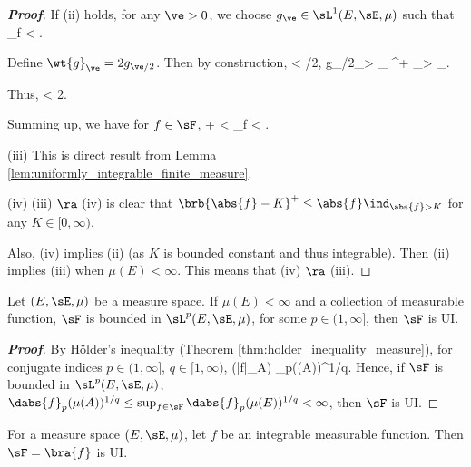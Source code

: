 \begin{proof}[\bf Proof]
If (ii) holds, for any $\ve >0$, we choose $g_\ve \in \sL^1(E,\sE,\mu)$ such that
\be
\sup_{f\in \sF}\mu{} < \ve.
\ee

Define $\wt{g}_\ve = 2g_{\ve/2}$. Then by construction, \be \mu{} \leq \mu{} < \ve/2, \qquad g_{\ve/2}\ind_{>
_\ve} \leq  {}^+ \ind_{> _\ve}. \ee

Thus,
\be
\mu{} \leq \mu{} <  \frac{\ve}2.
\ee

Summing up, we have for $f\in \sF$,
\be
\mu{} \leq  \mu{} + \mu{} < \ve\quad  \ra \quad
\sup_{f\in \sF} \mu{} < \ve.
\ee

\item [(iii)] This is direct result from Lemma \ref{lem:uniformly_integrable_finite_measure}.
\item [(iv)] (iii) $\ra$ (iv) is clear that $\brb{\abs{f}-K}^+ \leq \abs{f}\ind_{\abs{f}>K}$ for any $K\in [0,\infty)$.

Also, (iv) implies (ii) (as $K$ is bounded constant and thus integrable). Then (ii) implies (iii) when $\mu(E) < \infty$. This means that (iv) $\ra$ (iii).
\een
\end{proof}




\begin{proposition}\label{pro:slp_implies_ui}
Let $(E,\sE,\mu)$ be a measure space. If $\mu(E)<\infty$ and a collection of measurable function, $\sF$ is bounded in $\sL^p(E,\sE,\mu)$, for some $p \in (1,\infty]$, then $\sF$ is UI.
\end{proposition}
\begin{proof}[\bf Proof]
By H\"older's inequality (Theorem \ref{thm:holder_inequality_measure}), for conjugate indices $p \in (1,\infty]$, $q \in [1,\infty)$, \be \mu(|f|\ind_A) \leq {}_p(\mu(A))^{1/q}. \ee Hence, if
$\sF$ is bounded in $\sL^p(E,\sE,\mu)$, $\dabs{f}_p(\mu(A))^{1/q} \leq \sup_{f\in \sF}\dabs{f}_p (\mu(E))^{1/q} < \infty$, then $\sF$ is UI.
\end{proof}



\begin{lemma}\label{lem:single_integrable_function_ui}
For a measure space $(E,\sE,\mu)$, let $f$ be an integrable measurable function. Then $\sF = \bra{f}$ is UI.
\end{lemma}


